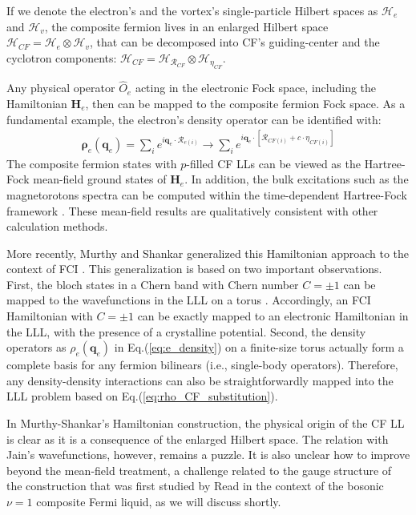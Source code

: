 If we denote the electron's and the vortex's single-particle Hilbert spaces as $\mathcal H_e$ and $\mathcal H_v$,  the composite fermion lives in an enlarged Hilbert space $\mathcal H_{CF}=\mathcal H_e\otimes \mathcal H_v$, that can be decomposed into CF's guiding-center and the cyclotron components: $\mathcal H_{CF}=\mathcal H_{\mathcal R_{CF}}\otimes \mathcal H_{\eta_{CF}}$.

Any physical operator $\hat O_e$ acting in the electronic Fock space, including the Hamiltonian $\mathbf H_e$, then can be mapped to the composite fermion Fock space. As a fundamental example, the electron's density operator can be identified with:
\begin{align}
    \pmb{\boldsymbol\rho}_e(\mathbf q_e)=\sum_{i}e^{i\mathbf q_e\cdot \mathcal R_{e(i)}} \rightarrow \sum_{i}e^{i\mathbf q_e\cdot\left[\mathcal R_{CF(i)}+c\cdot\eta_{CF(i)}\right]}  \label{eq:rho_CF_substitution}
\end{align}
The composite fermion states with $p$-filled CF LLs can be viewed as the Hartree-Fock mean-field ground states of $\mathbf H_e$. In addition, the bulk excitations such as the magnetorotons spectra can be computed within the time-dependent Hartree-Fock framework \cite{murthy1999hamiltonian, murthy2001hamiltonian}. These mean-field results are qualitatively consistent with other calculation methods.

More recently, Murthy and Shankar generalized this Hamiltonian approach to the context of FCI \cite{murthy2012hamiltonian}. This generalization is based on two important observations. First, the bloch states in a Chern band with Chern number $C=\pm 1$ can be mapped to the wavefunctions in the LLL on a torus \cite{haldane1985periodic}. Accordingly, an FCI Hamiltonian with $C=\pm 1$ can be exactly mapped to an electronic Hamiltonian in the LLL, with the presence of a crystalline potential. Second, the density operators as $\rho_e(\mathbf q_e)$ in Eq.(\ref{eq:e_density}) on a finite-size torus actually form a complete basis for any fermion bilinears (i.e., single-body operators). Therefore, any density-density interactions can also be straightforwardly mapped into the LLL problem based on Eq.(\ref{eq:rho_CF_substitution}).

In Murthy-Shankar's Hamiltonian construction, the physical origin of the CF LL is clear as it is a consequence of the enlarged Hilbert space. The relation with Jain's wavefunctions, however, remains a puzzle. It is also unclear how to improve beyond the mean-field treatment, a challenge related to the gauge structure of the construction that was first studied by Read \cite{read1998lowest} in the context of the bosonic $\nu=1$ composite Fermi liquid, as we will discuss shortly.

